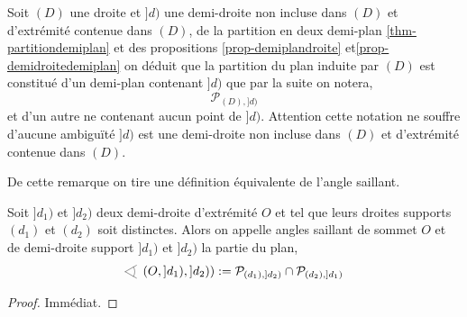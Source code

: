 \begin{rema}
    Soit $(D)$ une droite et $]d)$ une demi-droite non incluse dans $(D)$ et d'extrémité contenue dans $(D)$, de la partition en deux demi-plan \ref{thm-partitiondemiplan} et des propositions \ref{prop-demiplandroite} et\ref{prop-demidroitedemiplan} on déduit que la partition du plan induite par $(D)$ est constitué d'un demi-plan contenant $]d)$ que par la suite on notera,
    \begin{equation*}
        \mathcal{P}_{(D),]d)}    
    \end{equation*}
    et d'un autre ne contenant aucun point de $]d)$.  Attention cette notation ne souffre d'aucune ambiguïté \ssi $]d)$ est une demi-droite non incluse dans $(D)$ et d'extrémité contenue dans $(D)$.

    De cette remarque on tire une définition équivalente de l'angle saillant. 
\end{rema}
\begin{prop}\label{prop-anglesaillantequiv}
    Soit $]d_1)$ et $]d_2)$ deux demi-droite d'extrémité $O$ et tel que leurs droites supports $(d_1)$ et $(d_2)$ soit distinctes. Alors on appelle angles saillant de sommet $O$ et de demi-droite support $]d_1)$ et $]d_2)$ la partie du plan,
    \begin{equation*}
        \anglesaillant\left(O,]d_1),]d_2)\right) := \mathcal{P}_{(d_1),]d_2)}\cap \mathcal{P}_{(d_2),]d_1)}
    \end{equation*}
\begin{proof}
    Immédiat.
\end{proof}
\end{prop}

